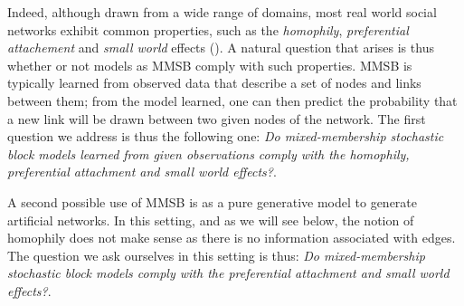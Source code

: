 Indeed, although drawn from a wide range of domains, most real world social networks exhibit common properties, such as the \textit{homophily}, \textit{preferential attachement} and \textit{small world} effects (\cite{Newman2010, Barabasi2003}). 
%
%
A natural question that arises is thus whether or not models as MMSB comply with such properties. MMSB is typically learned from observed data that describe a set of nodes and links between them; from the model learned, one can then predict the probability that a new link will be drawn between two given nodes of the network. The first question we address is thus the following one: \textit{Do  mixed-membership stochastic block models learned from given observations comply with the homophily, preferential attachment and small world effects?}.

A second possible use of MMSB is as a pure generative model to generate artificial networks. In this setting, and as we will see below, the notion of homophily does not make sense as there is no information associated with edges. The question we ask ourselves in this setting is thus: \textit{Do mixed-membership stochastic block models comply with the preferential attachment and small world effects?}.

